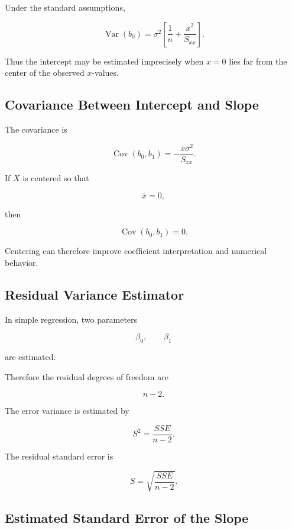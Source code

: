 Under the standard assumptions,

\[
\boxed{
\operatorname{Var}(b_0)
=
\sigma^2
\left[
\frac1n
+
\frac{
\overline{x}^2
}{
S_{xx}
}
\right].
}
\]

Thus the intercept may be estimated imprecisely when \(x=0\) lies far
from the center of the observed \(x\)-values.

\subsection{Covariance Between Intercept and Slope}
\label{subsec:covariance-intercept-slope}

The covariance is

\[
\boxed{
\operatorname{Cov}(b_0,b_1)
=
-
\frac{
\overline{x}\sigma^2
}{
S_{xx}
}.
}
\]

If \(X\) is centered so that

\[
\overline{x}=0,
\]

then

\[
\boxed{
\operatorname{Cov}(b_0,b_1)=0.
}
\]

Centering can therefore improve coefficient interpretation and numerical
behavior.

\subsection{Residual Variance Estimator}
\label{subsec:residual-variance-estimator}

In simple regression, two parameters

\[
\beta_0,
\qquad
\beta_1
\]

are estimated.

Therefore the residual degrees of freedom are

\[
\boxed{
n-2.
}
\]

The error variance is estimated by

\[
\boxed{
S^2
=
\frac{
SSE
}{
n-2
}.
}
\]

The residual standard error is

\[
\boxed{
S
=
\sqrt{
\frac{
SSE
}{
n-2
}
}.
}
\]

\subsection{Estimated Standard Error of the Slope}
\label{subsec:estimated-se-slope}

